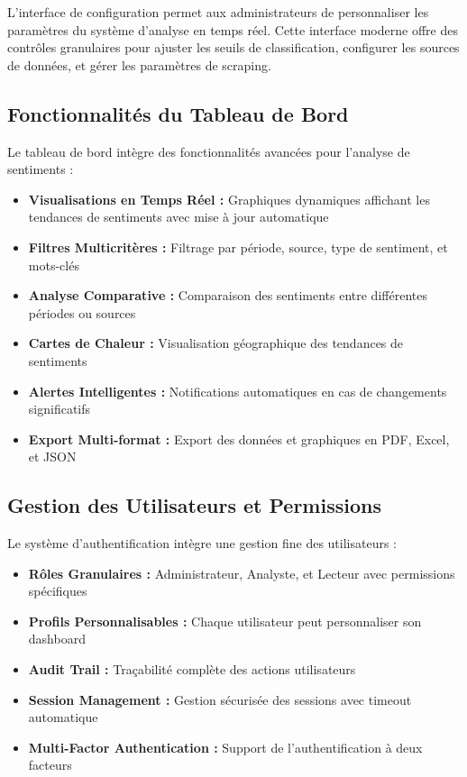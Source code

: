 L'interface de configuration permet aux administrateurs de personnaliser les paramètres du système d'analyse en temps réel. Cette interface moderne offre des contrôles granulaires pour ajuster les seuils de classification, configurer les sources de données, et gérer les paramètres de scraping.

\subsection{Fonctionnalités du Tableau de Bord}

Le tableau de bord intègre des fonctionnalités avancées pour l'analyse de sentiments :

\begin{itemize}
    \item \textbf{Visualisations en Temps Réel :} Graphiques dynamiques affichant les tendances de sentiments avec mise à jour automatique
    \item \textbf{Filtres Multicritères :} Filtrage par période, source, type de sentiment, et mots-clés
    \item \textbf{Analyse Comparative :} Comparaison des sentiments entre différentes périodes ou sources
    \item \textbf{Cartes de Chaleur :} Visualisation géographique des tendances de sentiments
    \item \textbf{Alertes Intelligentes :} Notifications automatiques en cas de changements significatifs
    \item \textbf{Export Multi-format :} Export des données et graphiques en PDF, Excel, et JSON
\end{itemize}

\subsection{Gestion des Utilisateurs et Permissions}

Le système d'authentification intègre une gestion fine des utilisateurs :

\begin{itemize}
    \item \textbf{Rôles Granulaires :} Administrateur, Analyste, et Lecteur avec permissions spécifiques
    \item \textbf{Profils Personnalisables :} Chaque utilisateur peut personnaliser son dashboard
    \item \textbf{Audit Trail :} Traçabilité complète des actions utilisateurs
    \item \textbf{Session Management :} Gestion sécurisée des sessions avec timeout automatique
    \item \textbf{Multi-Factor Authentication :} Support de l'authentification à deux facteurs
\end{itemize}

